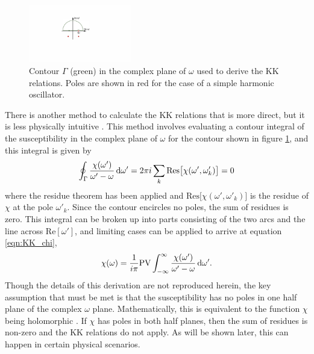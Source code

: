\begin{figure}
	\centering
	\includegraphics[width=0.4\textwidth]{figures/CATS/KK_no_pump.pdf}
	\caption[Contour used to derive KK relations]{Contour $\Gamma$ (green) in the complex plane of $\omega$ used to derive the KK relations.  Poles are shown in red for the case of a simple harmonic oscillator.}
	\label{fig:KK_contour}
\end{figure}

There is another method to calculate the KK relations that is more direct, but it is less physically intuitive \cite{jacksonClassicalElectrodynamics1999, hutchingsKramersKronigRelationsNonlinear1992, lucariniKramersKronigRelationsOptical2005}. This method involves evaluating a contour integral of the susceptibility in the complex plane of $\omega$ for the contour shown in figure \ref{fig:KK_contour}, and this integral is given by 
\begin{equation}
	\label{eqn:contour_int}
	\oint_{\Gamma}\frac{\chi(\omega')}{\omega' - \omega} \mathop{}\!\mathrm{d} \omega' = 2\pi i \sum_{k}\mathrm{Res}\big[ \chi(\omega', \omega'_{k}) \big]=0
\end{equation} 
where the residue theorem has been applied and $\mathrm{Res}\big[ \chi(\omega', \omega'_{k}) \big]$ is the residue of $\chi$ at the pole $\omega'_k$.  Since the contour encircles no poles, the sum of residues is zero.  This integral can be broken up into parts consisting of the two arcs and the line across $\mathrm{Re}[\omega']$, and limiting cases can be applied to arrive at equation \ref{eqn:KK_chi},
\begin{equation}
	\chi(\omega)=\frac{1}{i\pi}\mathrm{PV}\int_{-\infty}^{\infty}\frac{\chi(\omega')}{\omega' - \omega}\mathop{}\!\mathrm{d} \omega'.
\end{equation}
Though the details of this derivation are not reproduced herein, the key assumption that must be met is that the susceptibility has no poles in one half plane of the complex $\omega$ plane.  Mathematically, this is equivalent to the function $\chi$ being holomorphic \cite{lucariniKramersKronigRelationsOptical2005}.  If $\chi$ has poles in both half planes, then the sum of residues is non-zero and the KK relations do not apply.  As will be shown later, this can happen in certain physical scenarios.

